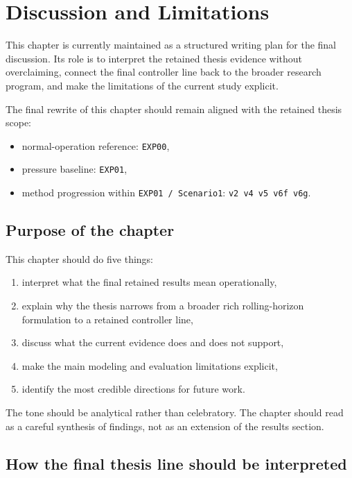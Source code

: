 \chapter{Discussion and Limitations}
\label{ch:discussion_limitations}

This chapter is currently maintained as a structured writing plan for the final discussion. Its role is to interpret the retained thesis evidence without overclaiming, connect the final controller line back to the broader research program, and make the limitations of the current study explicit.

The final rewrite of this chapter should remain aligned with the retained thesis scope:
\begin{itemize}
    \item normal-operation reference: \texttt{EXP00},
    \item pressure baseline: \texttt{EXP01},
    \item method progression within \texttt{EXP01 / Scenario1}: \texttt{v2 \textrightarrow v4 \textrightarrow v5 \textrightarrow v6f \textrightarrow v6g}.
\end{itemize}

\section{Purpose of the chapter}

This chapter should do five things:
\begin{enumerate}
    \item interpret what the final retained results mean operationally,
    \item explain why the thesis narrows from a broader rich rolling-horizon formulation to a retained controller line,
    \item discuss what the current evidence does and does not support,
    \item make the main modeling and evaluation limitations explicit,
    \item identify the most credible directions for future work.
\end{enumerate}

The tone should be analytical rather than celebratory. The chapter should read as a careful synthesis of findings, not as an extension of the results section.

\section{How the final thesis line should be interpreted}

